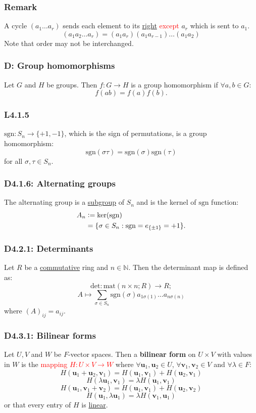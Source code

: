 \documentclass{article}
\newcommand{\deq}{\vcentcolon=}
\newcommand{\vc}[1]{\boldsymbol{#1}}
\begin{document}
\begin{multicols*}{3}
\subsubsection*{Remark}
A cycle $(a_1\dots a_r)$ sends each element to its
\underline{right} \textcolor{red}{except}
$a_r$ which is sent to $a_1$.
$$(a_1 a_2\dots a_r)=(a_1 a_r)(a_1 a_{r-1})\dots(a_1 a_2)$$
Note that order may not be interchanged.

\subsubsection*{D: Group homomorphisms}
Let $G$ and $H$ be groups. Then $f:G\rightarrow H$
is a group homomorphism if $\forall a,b\in G$:
$$f(ab)=f(a)f(b).$$

\subsubsection*{L4.1.5}
$\text{sgn}:S_n\rightarrow\{+1,-1\}$, which is the sign of
permutations, is a group homomorphism:
$$\text{sgn}(\sigma\tau)=\text{sgn}(\sigma)\text{sgn}(\tau)$$
for all $\sigma,\tau\in S_n$.

\subsubsection*{D4.1.6: Alternating groups}
The alternating group is a \underline{subgroup} of $S_n$
and is the kernel of $\text{sgn}$ function:
\begin{align*}
    A_n &\deq \ker(\text{sgn}) \\
    &=\{\sigma\in S_n:\text{sgn}=e_{\{\pm1\}}=+1\}.
\end{align*}

\subsubsection*{D4.2.1: Determinants}
Let $R$ be a \underline{commutative} ring and $n\in\mathbb{N}$.
Then the determinant map is defined as:
$$\text{det}:\text{mat}(n\times n; R)\rightarrow R;$$
$$A\mapsto\sum_{\sigma\in S_n}\text{sgn}(\sigma)
a_{1\sigma(1)}\dots a_{n\sigma(n)}$$
where $(A)_{ij}=a_{ij}$.

\subsubsection*{D4.3.1: Bilinear forms}
Let $U,V$ and $W$ be $F$-vector spaces. Then
a \textbf{bilinear form} on $U\times V$ with values in $W$
is the \textcolor{red}{mapping $H:U\times V\rightarrow W$} where
$\forall\vc{u}_1,\vc{u}_2\in U$, $\forall\vc{v}_1,\vc{v}_2\in V$
and $\forall\lambda\in F$:
$$H(\vc{u}_1+\vc{u}_2,\vc{v}_1)=H(\vc{u}_1,\vc{v}_1)
+H(\vc{u}_2,\vc{v}_1)$$
$$H(\lambda\vc{u}_1,\vc{v}_1)=\lambda H(\vc{u}_1,\vc{v}_1)$$
$$H(\vc{u}_1,\vc{v}_1+\vc{v}_2)=H(\vc{u}_1,\vc{v}_1)
+H(\vc{u}_2,\vc{v}_2)$$
$$H(\vc{u}_1,\lambda\vc{u}_1)=\lambda H(\vc{v}_1,\vc{u}_1)$$
or that every entry of $H$ is \underline{linear}.


\end{multicols*}
\end{document}
